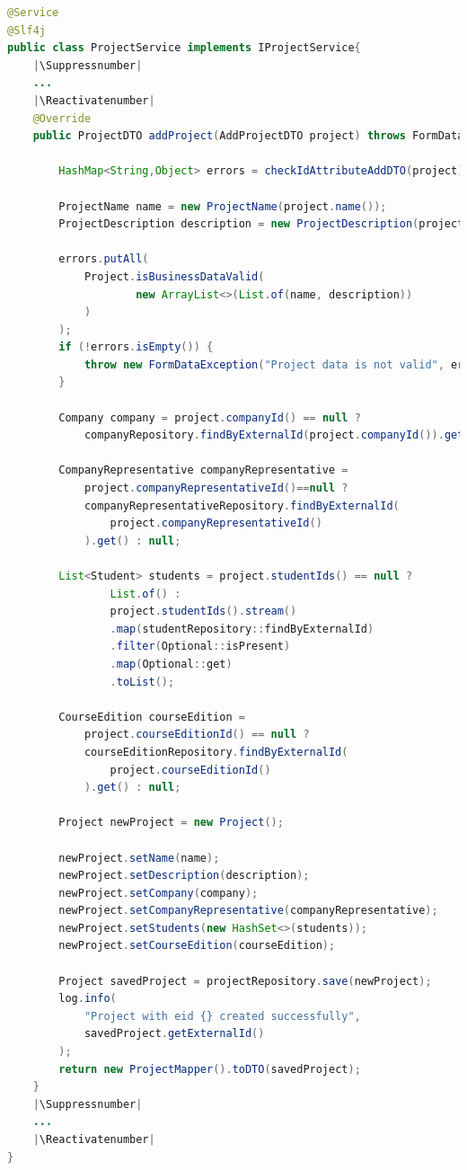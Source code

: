 \begin{lstlisting}[language=Java, caption={Implementação do metodo para criação de um novo projeto}, label={lst:method-create-new-project-class-ProjectService}]
@Service
@Slf4j
public class ProjectService implements IProjectService{
    |\Suppressnumber|
    ... 
    |\Reactivatenumber|
    @Override
    public ProjectDTO addProject(AddProjectDTO project) throws FormDataException {

        HashMap<String,Object> errors = checkIdAttributeAddDTO(project);

        ProjectName name = new ProjectName(project.name());
        ProjectDescription description = new ProjectDescription(project.description());

        errors.putAll(
            Project.isBusinessDataValid(
                    new ArrayList<>(List.of(name, description))
            )
        );
        if (!errors.isEmpty()) {
            throw new FormDataException("Project data is not valid", errors);
        }

        Company company = project.companyId() == null ? 
            companyRepository.findByExternalId(project.companyId()).get() : null;

        CompanyRepresentative companyRepresentative =
            project.companyRepresentativeId()==null ? 
            companyRepresentativeRepository.findByExternalId(
                project.companyRepresentativeId()
            ).get() : null;
        
        List<Student> students = project.studentIds() == null ? 
                List.of() : 
                project.studentIds().stream()
                .map(studentRepository::findByExternalId)
                .filter(Optional::isPresent)
                .map(Optional::get)
                .toList();

        CourseEdition courseEdition = 
            project.courseEditionId() == null ? 
            courseEditionRepository.findByExternalId(
                project.courseEditionId()
            ).get() : null;

        Project newProject = new Project();

        newProject.setName(name);
        newProject.setDescription(description);
        newProject.setCompany(company);
        newProject.setCompanyRepresentative(companyRepresentative);
        newProject.setStudents(new HashSet<>(students));
        newProject.setCourseEdition(courseEdition);

        Project savedProject = projectRepository.save(newProject);
        log.info(
            "Project with eid {} created successfully", 
            savedProject.getExternalId()
        );
        return new ProjectMapper().toDTO(savedProject);
    }
    |\Suppressnumber|
    ...
    |\Reactivatenumber|
}

\end{lstlisting}